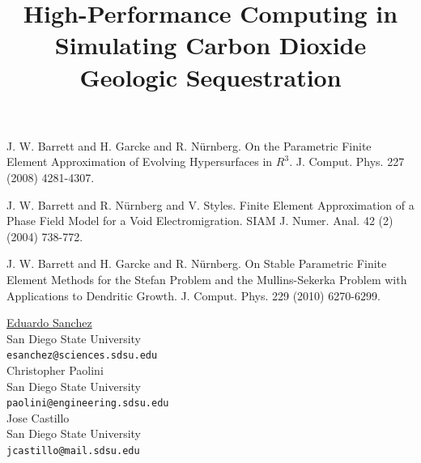 \documentclass[article,A4,11pt]{llncs}%
\begin{document}

\begin{thebibliography}{10}
{\sc J. W. Barrett and H. Garcke and R. N\"{u}rnberg}. {On the Parametric Finite Element Approximation of Evolving Hypersurfaces in ${R}^3$}. J. Comput. Phys. 227 (2008) 4281-4307.

{\sc J. W. Barrett and R. N\"{u}rnberg and V. Styles}. {Finite Element Approximation of a Phase Field Model for a Void Electromigration}. SIAM J. Numer. Anal.  42 (2) (2004) 738-772.

{\sc J. W. Barrett and H. Garcke and R. N\"{u}rnberg}. {On Stable Parametric Finite Element Methods for the Stefan Problem and the Mullins-Sekerka Problem with Applications to Dendritic Growth}. J. Comput. Phys. 229 (2010) 6270-6299.
\end{thebibliography}

\title{High-Performance Computing in Simulating Carbon Dioxide Geologic Sequestration}
 \author{} \institute{}
\maketitle
\begin{center}
{\large \underline{Eduardo Sanchez}}\\
San Diego State University\\
{\tt esanchez@sciences.sdsu.edu}
\\ \vspace{4mm}
{\large Christopher Paolini}\\
San Diego State University\\
{\tt paolini@engineering.sdsu.edu}
\\ \vspace{4mm}
{\large Jose Castillo}\\
San Diego State University\\
{\tt jcastillo@mail.sdsu.edu}
\end{center}
\end{document}
